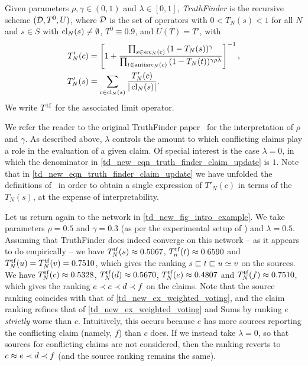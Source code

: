 \begin{definition}
    Given parameters $\rho, \gamma \in (0, 1)$ and $\lambda \in [0, 1]$,
    \emph{TruthFinder} is the recursive scheme $(\mathcal{D}, T^0, U)$, where $\mathcal{D}$ is
    the set of operators with $0 < T_N(s) < 1$ for all $N$ and $s \in S$ with
    $\operatorname{cl}_N(s) \ne \emptyset$, $T^0 \equiv 0.9$, and $U(T) = T'$, with
    \begin{align}
        \label{td_new_eqn_truth_finder_claim_update}
        T'_N(c) &= \left[
            1 +
            \frac{
                \prod_{s \in \operatorname{src}_N(c)}{(1 - T_N(s))^\gamma}
            }{
                \prod_{t \in \operatorname{antisrc}_N(c)}{(1 - T_N(t))^{\gamma\rho\lambda}}
            }
        \right]^{-1}, \\
        T'_N(s) &= \sum_{c \in \operatorname{cl}_N(s)}{
            \frac{T'_N(c)}{|\operatorname{cl}_N(s)|}
        }.
    \end{align}
    We write $T^{\operatorname{tf}}$ for the associated limit operator.
\end{definition}

We refer the reader to the original TruthFinder paper~\cite{yin2008} for the
interpretation of $\rho$ and $\gamma$. As described above, $\lambda$ controls
the amount to which conflicting claims play a role in the evaluation of a given
claim. Of special interest is the case $\lambda = 0$, in which the denominator
in \cref{td_new_eqn_truth_finder_claim_update} is $1$. Note that in
\cref{td_new_eqn_truth_finder_claim_update} we have unfolded the definitions
of~\cite{yin2008} in order to obtain a single expression of $T'_N(c)$ in terms
of the $T_N(s)$, at the expense of interpretability.

Let us return again to the network in \cref{td_new_fig_intro_example}. We take
parameters $\rho = 0.5$ and $\gamma = 0.3$ (as per the experimental setup of
\textcite{yin2008}) and $\lambda = 0.5$. Assuming that TruthFinder does indeed
converge on this network -- as it appears to do empirically -- we have
$T^{\operatorname{tf}}_N(s) \approx 0.5067$, $T^{\operatorname{tf}}_n(t) \approx 0.6590$ and
$T^{\operatorname{tf}}_N(u) = T^{\operatorname{tf}}_N(v) = 0.7510$, which gives the ranking $s
\sqsubset t \sqsubset u \simeq v$ on the sources. We have $T^{\operatorname{tf}}_N(c) \approx
0.5328$, $T^{\operatorname{tf}}_N(d) \approx 0.5670$, $T^{\operatorname{tf}}_N(e) \approx 0.4807$
and $T^{\operatorname{tf}}_N(f) \approx 0.7510$, which gives the ranking $e \prec c \prec
d \prec f$ on the claims. Note that the source ranking coincides with that of
\cref{td_new_ex_weighted_voting}, and the claim ranking refines that of
\cref{td_new_ex_weighted_voting} and Sums by ranking $e$ \emph{strictly} worse
than $c$. Intuitively, this occurs because $e$ has more sources reporting the
conflicting claim (namely, $f$) than $c$ does. If we instead take $\lambda =
0$, so that sources for conflicting claims are not considered, then the ranking
reverts to $c \approx e \prec d \prec f$ (and the source ranking remains the same).

